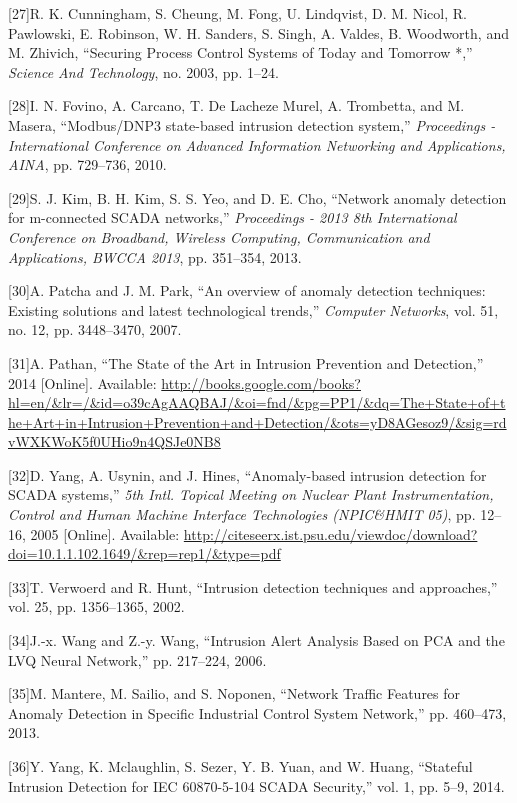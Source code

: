\documentclass[12pt,]{article}
\begin{document}
{[}27{]}R. K. Cunningham, S. Cheung, M. Fong, U. Lindqvist, D. M. Nicol,
R. Pawlowski, E. Robinson, W. H. Sanders, S. Singh, A. Valdes, B.
Woodworth, and M. Zhivich, ``Securing Process Control Systems of Today
and Tomorrow *,'' \emph{Science And Technology}, no. 2003, pp. 1--24.

{[}28{]}I. N. Fovino, A. Carcano, T. {De Lacheze Murel}, A. Trombetta,
and M. Masera, ``Modbus/DNP3 state-based intrusion detection system,''
\emph{Proceedings - International Conference on Advanced Information
Networking and Applications, AINA}, pp. 729--736, 2010.

{[}29{]}S. J. Kim, B. H. Kim, S. S. Yeo, and D. E. Cho, ``Network
anomaly detection for m-connected SCADA networks,'' \emph{Proceedings -
2013 8th International Conference on Broadband, Wireless Computing,
Communication and Applications, BWCCA 2013}, pp. 351--354, 2013.

{[}30{]}A. Patcha and J. M. Park, ``An overview of anomaly detection
techniques: Existing solutions and latest technological trends,''
\emph{Computer Networks}, vol. 51, no. 12, pp. 3448--3470, 2007.

{[}31{]}A. Pathan, ``The State of the Art in Intrusion Prevention and
Detection,'' 2014 {[}Online{]}. Available:
\url{http://books.google.com/books?hl=en/\&lr=/\&id=o39cAgAAQBAJ/\&oi=fnd/\&pg=PP1/\&dq=The+State+of+the+Art+in+Intrusion+Prevention+and+Detection/\&ots=yD8AGesoz9/\&sig=rdvWXKWoK5f0UHio9n4QSJe0NB8}

{[}32{]}D. Yang, A. Usynin, and J. Hines, ``Anomaly-based intrusion
detection for SCADA systems,'' \emph{5th Intl. Topical Meeting on
Nuclear Plant Instrumentation, Control and Human Machine Interface
Technologies (NPIC\&HMIT 05)}, pp. 12--16, 2005 {[}Online{]}. Available:
\url{http://citeseerx.ist.psu.edu/viewdoc/download?doi=10.1.1.102.1649/\&rep=rep1/\&type=pdf}

{[}33{]}T. Verwoerd and R. Hunt, ``Intrusion detection techniques and
approaches,'' vol. 25, pp. 1356--1365, 2002.

{[}34{]}J.-x. Wang and Z.-y. Wang, ``Intrusion Alert Analysis Based on
PCA and the LVQ Neural Network,'' pp. 217--224, 2006.

{[}35{]}M. Mantere, M. Sailio, and S. Noponen, ``Network Traffic
Features for Anomaly Detection in Specific Industrial Control System
Network,'' pp. 460--473, 2013.

{[}36{]}Y. Yang, K. Mclaughlin, S. Sezer, Y. B. Yuan, and W. Huang,
``Stateful Intrusion Detection for IEC 60870-5-104 SCADA Security,''
vol. 1, pp. 5--9, 2014.
\end{document}
